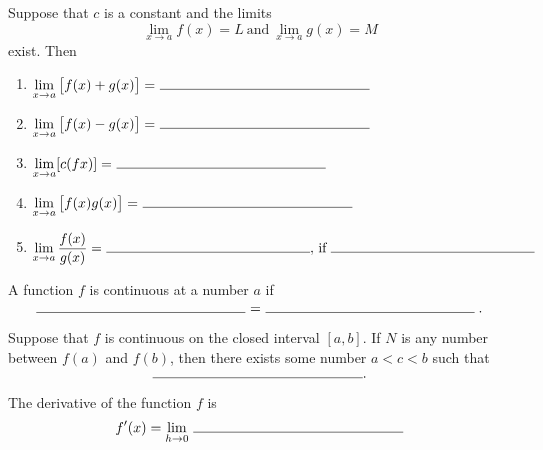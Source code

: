 \documentclass[12pt]{amsart}
\begin{document}
\begin{thm}[6 Points]
  Suppose that \(c\) is a constant and the limits
  \[\lim_{x \to a} f(x) = L\ \text{and}\ \lim_{x \to a} g(x) = M\]
  exist.
  Then
  \begin{enumerate}
  \item
    \(\displaystyle{\lim_{x \to a} \left[f(x) + g(x)\right] =\ \line(1,0){150}}\)
    \vspace{.25in}
  \item
    \(\displaystyle{\lim_{x \to a} \left[f(x) - g(x)\right] =\ \line(1,0){150}}\)
    \vspace{.25in}
  \item
    \(\displaystyle{\lim_{x \to a} [c(fx)] =\ \line(1,0){150}}\)
    \vspace{.25in}
  \item
    \(\displaystyle{\lim_{x \to a} \left[f(x)g(x)\right] =\ \line(1,0){150}}\)
    \vspace{.25in}
  \item
    \(\displaystyle{\lim_{x \to a} \frac{f(x)}{g(x)} =\ \line(1,0){150},\, \text{if}\ \line(1,0){150}}\)
    \vspace{.25in}
  \end{enumerate}
\end{thm}

\begin{thm}[2 Points]
  A function \(f\) is continuous at a number \(a\) if
  \vspace{.25in}
  \[\line(1,0){150}\ =\ \line(1,0){150}.\]
\end{thm}

\begin{thm}[1 Point]
  Suppose that \(f\) is continuous on the closed interval \([a,b]\).
  If \(N\) is any number between \(f(a)\) and \(f(b)\), then there exists some number \(a < c < b\) such that
  \vspace{.25in}
  \[\line(1,0){150}.\]
\end{thm}

\begin{thm}[1 Point]
  The derivative of the function \(f\) is
  \vspace{.5in}
  \[f^\prime(x) = \lim_{h \to 0}\ \line(1,0){150}\]
\end{thm}

\vspace{.25in}
\end{document}
